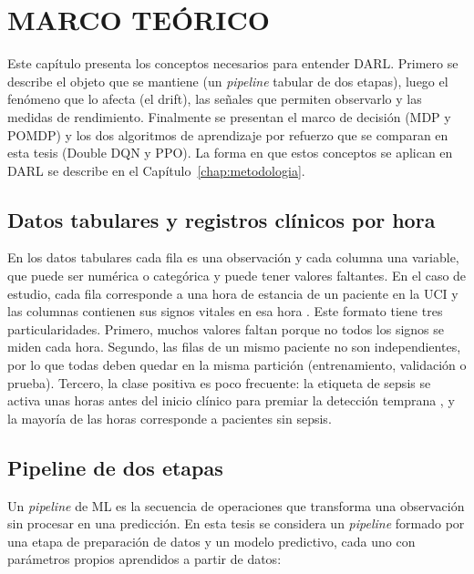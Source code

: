 \chapter{MARCO TEÓRICO}
\label{chap:marco}

Este capítulo presenta los conceptos necesarios para entender DARL. Primero se describe el
objeto que se mantiene (un \textit{pipeline} tabular de dos etapas), luego el fenómeno que
lo afecta (el drift), las señales que permiten observarlo y las medidas de rendimiento.
Finalmente se presentan el marco de decisión (MDP y POMDP) y los dos algoritmos de
aprendizaje por refuerzo que se comparan en esta tesis (Double DQN y PPO). La forma en que
estos conceptos se aplican en DARL se describe en el Capítulo~\ref{chap:metodologia}.

\section{Datos tabulares y registros clínicos por hora}

En los datos tabulares cada fila es una observación y cada columna una variable, que puede
ser numérica o categórica y puede tener valores faltantes. En el caso de estudio, cada fila
corresponde a una hora de estancia de un paciente en la UCI y las columnas contienen sus
signos vitales en esa hora \cite{reyna2020sepsis}. Este formato tiene tres
particularidades. Primero, muchos valores faltan porque no todos los signos se miden cada
hora. Segundo, las filas de un mismo paciente no son independientes, por lo que todas deben
quedar en la misma partición (entrenamiento, validación o prueba). Tercero, la clase
positiva es poco frecuente: la etiqueta de sepsis se activa unas horas antes del inicio
clínico para premiar la detección temprana \cite{reyna2020sepsis,singer2016sepsis3}, y la
mayoría de las horas corresponde a pacientes sin sepsis.

\section{Pipeline de dos etapas}
\label{sec:pipeline}

Un \textit{pipeline} de ML es la secuencia de operaciones que transforma una observación sin
procesar en una predicción. En esta tesis se considera un \textit{pipeline} formado por una
etapa de preparación de datos y un modelo predictivo, cada uno con parámetros propios
aprendidos a partir de datos:

